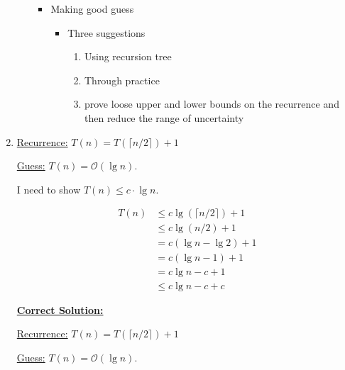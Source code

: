 \documentclass[12pt]{article}
\begin{document}
\begin{enumerate}[1.]
\begin{itemize}
\begin{itemize}
            \item Making good guess

            \begin{itemize}
                \item Three suggestions
                \begin{enumerate}[1.]
                    \item Using recursion tree
                    \item Through practice
                    \item prove loose upper and lower bounds on the recurrence and then reduce the range of uncertainty
                \end{enumerate}
            \end{itemize}
        \end{itemize}
    \end{itemize}

    \item
    \setcounter{equation}{0}
    \underline{Recurrence:} $T(n) = T(\lceil n/2 \rceil) + 1$

    \bigskip

    \underline{Guess:} $T(n) = \mathcal{O}(\lg n)$.

    \bigskip

    I need to show $T(n) \leq c \cdot \lg n$.

    \bigskip

    \begin{align}
        T(n) &\leq c\lg (\lceil n/2 \rceil) + 1\\
        &\leq c \lg (n/2) + 1 \\
        &= c (\lg n - \lg 2) + 1\\
        &= c (\lg n - 1) + 1\\
        &= c\lg n - c + 1\\
        &\leq c\lg n - c + c
    \end{align}

    \bigskip

    \begin{mdframed}
        \setcounter{equation}{0}
        \underline{\textbf{Correct Solution:}}

        \bigskip

        \underline{Recurrence:} $T(n) = T(\lceil n/2 \rceil) + 1$

        \bigskip

        \underline{Guess:} $T(n) = \mathcal{O}(\lg n)$.


\end{mdframed}
\end{enumerate}
\end{document}
